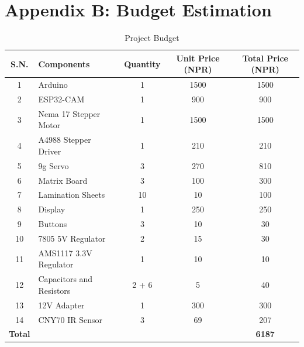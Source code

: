 \section*{Appendix B: Budget Estimation}
\begin{table}[h!]
    \centering
    \caption{Project Budget}
    \label{tab:budget-estimation}
    \begin{tabular}{|c|l|c|c|c|}
        \hline
        \textbf{S.N.} & \textbf{Components}                & \textbf{Quantity} & \textbf{Unit Price (NPR)} & \textbf{Total Price (NPR)} \\ \hline
        1  & Arduino                           & 1                  & 1500                      & 1500                       \\ \hline
        2  & ESP32-CAM                         & 1                  & 900                       & 900                        \\ \hline
        3  & Nema 17 Stepper Motor             & 1                  & 1500                      & 1500                       \\ \hline
        4  & A4988 Stepper Driver              & 1                  & 210                       & 210                        \\ \hline
        5  & 9g Servo                          & 3                  & 270                       & 810                        \\ \hline
        6  & Matrix Board                      & 3                  & 100                       & 300                        \\ \hline
        7  & Lamination Sheets                 & 10                 & 10                        & 100                        \\ \hline
        8  & Display                           & 1                  & 250                       & 250                        \\ \hline
        9  & Buttons                           & 3                  & 10                        & 30                         \\ \hline
        10 & 7805 5V Regulator                 & 2                  & 15                        & 30                         \\ \hline
        11 & AMS1117 3.3V Regulator            & 1                  & 10                        & 10                         \\ \hline
        12 & Capacitors and Resistors          & 2 + 6              & 5                         & 40                         \\ \hline
        13 & 12V Adapter                       & 1                  & 300                       & 300                        \\ \hline
        14 & CNY70 IR Sensor                   & 3                  & 69                        & 207                        \\ \hline
        \textbf{Total} &                             &                    &                           & \textbf{6187}              \\ \hline
    \end{tabular}
\end{table}
